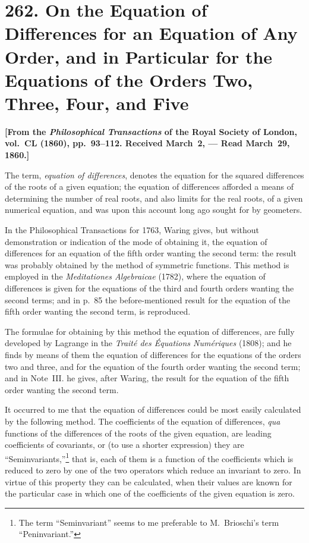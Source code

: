 \documentclass[11pt,a4paper]{article}
\theoremstyle{definition}
\begin{document}
\newpage
\section[262. On the Equation of Differences]{262. On the Equation of Differences for an Equation of Any Order, and in Particular for the Equations of the Orders Two, Three, Four, and Five}

\textbf{[From the \textit{Philosophical Transactions} of the Royal Society of London, vol.~CL (1860), pp.~93--112. Received March~2, --- Read March~29, 1860.]}

The term, \textit{equation of differences}, denotes the equation for the squared differences of the roots of a given equation; the equation of differences afforded a means of determining the number of real roots, and also limits for the real roots, of a given numerical equation, and was upon this account long ago sought for by geometers.

In the Philosophical Transactions for 1763, Waring gives, but without demonstration or indication of the mode of obtaining it, the equation of differences for an equation of the fifth order wanting the second term: the result was probably obtained by the method of symmetric functions. This method is employed in the \textit{Meditationes Algebraicae} (1782), where the equation of differences is given for the equations of the third and fourth orders wanting the second terms; and in p.~85 the before-mentioned result for the equation of the fifth order wanting the second term, is reproduced.

The formulae for obtaining by this method the equation of differences, are fully developed by Lagrange in the \textit{Trait\'{e} des \'{E}quations Num\'{e}riques} (1808); and he finds by means of them the equation of differences for the equations of the orders two and three, and for the equation of the fourth order wanting the second term; and in Note~III. he gives, after Waring, the result for the equation of the fifth order wanting the second term.

It occurred to me that the equation of differences could be most easily calculated by the following method. The coefficients of the equation of differences, \textit{qua} functions of the differences of the roots of the given equation, are leading coefficients of covariants, or (to use a shorter expression) they are ``Seminvariants,''\footnote{The term ``Seminvariant'' seems to me preferable to M.~Brioschi's term ``Peninvariant.''} that is, each of them is a function of the coefficients which is reduced to zero by one of the two operators which reduce an invariant to zero. In virtue of this property they can be calculated, when their values are known for the particular case in which one of the coefficients of the given equation is zero.
\end{document}
